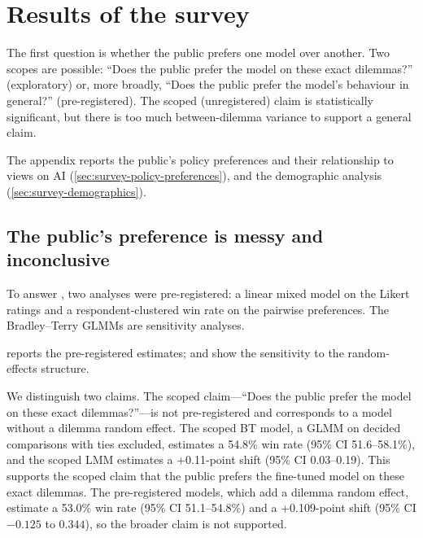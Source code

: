 \section{Results of the survey}
\label{sec:survey-results}

The first question is whether the public prefers one model over another. Two scopes are possible: ``Does the public prefer the model on these exact dilemmas?'' (exploratory) or, more broadly, ``Does the public prefer the model's behaviour in general?'' (pre-registered). The scoped (unregistered) claim is statistically significant, but there is too much between-dilemma variance to support a general claim.

The appendix reports the public's policy preferences and their relationship to views on AI (\ref{sec:survey-policy-preferences}), and the demographic analysis (\ref{sec:survey-demographics}).

\subsection{The public's preference is messy and inconclusive}

To answer , two analyses were pre-registered: a linear mixed model on the Likert ratings and a respondent-clustered win rate on the pairwise preferences. The Bradley–Terry GLMMs are sensitivity analyses.

 reports the pre-registered estimates;  and  show the sensitivity to the random-effects structure.


We distinguish two claims. The scoped claim—``Does the public prefer the model on these exact dilemmas?''—is not pre-registered and corresponds to a model without a dilemma random effect. The scoped BT model, a GLMM on decided comparisons with ties excluded, estimates a 54.8\% win rate (95\% CI 51.6–58.1\%), and the scoped LMM estimates a +0.11-point shift (95\% CI 0.03–0.19). This supports the scoped claim that the public prefers the fine-tuned model on these exact dilemmas. The pre-registered models, which add a dilemma random effect, estimate a 53.0\% win rate (95\% CI 51.1–54.8\%) and a +0.109-point shift (95\% CI $-0.125$ to $0.344$), so the broader claim is not supported.

